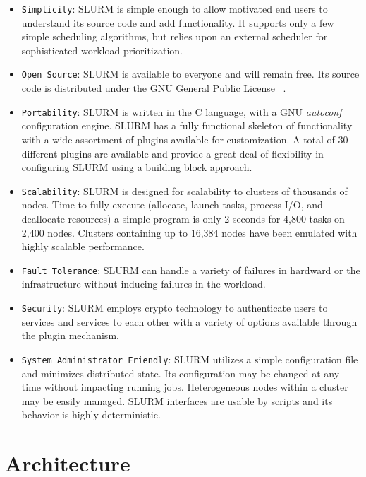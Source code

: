 \documentclass[10pt,twocolumn,times]{../common/llncs}
\begin{document}
{\begin{itemize}
\item {\tt Simplicity}: SLURM is simple enough to allow motivated 
end users to understand its source code and add functionality. 
It supports only a few simple scheduling algorithms, 
but relies upon an external scheduler for sophisticated
workload prioritization.

\item {\tt Open Source}: SLURM is available to everyone and 
will remain free.
Its source code is distributed under the GNU General Public
License
~\cite{GPL2002}.

\item {\tt Portability}: SLURM is written in the C language, 
with a GNU {\em autoconf} configuration engine.
SLURM has a fully functional skeleton of functionality with a
wide assortment of plugins available for customization. 
A total of 30 different plugins are available and provide a 
great deal of flexibility in configuring SLURM using a 
building block approach.

\item {\tt Scalability}: SLURM is designed for scalability to clusters 
of thousands of nodes. Time to fully execute (allocate, launch
tasks, process I/O, and deallocate resources) a simple program
is only 2 seconds for 4,800 tasks on 2,400 nodes. Clusters 
containing up to 16,384 nodes have been emulated with highly 
scalable performance. 

\item {\tt Fault Tolerance}: SLURM can handle a variety of failures
in hardward or the infrastructure without inducing failures in 
the workload.

\item {\tt Security}: SLURM employs crypto technology to authenticate
users to services and services to each other with a variety of options
available through the plugin mechanism.  

\item {\tt System Administrator Friendly}: SLURM utilizes
a simple configuration file and minimizes distributed state.
Its configuration may be changed at any time without impacting running
jobs.  Heterogeneous nodes within a cluster may be easily managed.  SLURM
interfaces are usable by scripts and its behavior is highly deterministic.

\end{itemize}

\section{Architecture}

}
\end{document}
